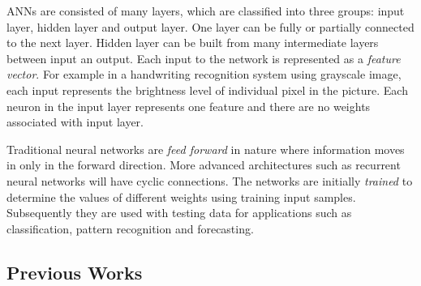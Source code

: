 ANNs are consisted of many layers, which are classified into three groups: input layer, hidden layer and output layer. 
One layer can be fully or partially connected to the next layer. 
Hidden layer can be built from many intermediate layers between input an output.
Each input to the network is represented as a \emph{feature vector}.
For example in a handwriting recognition system using grayscale image, each input represents the brightness level of individual pixel in the picture.
Each neuron in the input layer represents one feature and there are no weights associated with input layer.

Traditional neural networks are \emph{feed forward} in nature where information moves in only in the forward direction.
More advanced architectures such as recurrent neural networks will have cyclic connections.
The networks are initially \emph{trained} to determine the values of different weights using training input samples.
Subsequently they are used with testing data for applications such as classification, pattern recognition and forecasting.

\subsection{Previous Works}

